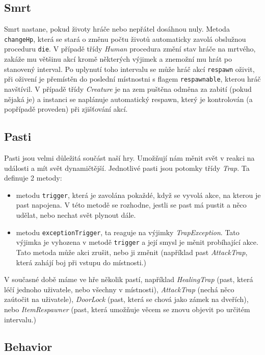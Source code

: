 \documentclass[11pt, a4paper]{article}
\def\class#1{\emph{#1}}
\begin{document}
\subsection{Smrt}

Smrt nastane, pokud životy hráče nebo nepřátel dosáhnou nuly. Metoda \texttt{changeHp}, která se stará o změnu počtu životů automaticky zavolá obslužnou proceduru \texttt{die}. V případě třídy \class{Human} procedura změní stav hráče na mrtvého, zakáže mu většinu akcí kromě některých výjimek a znemožní mu hrát po stanovený interval. Po uplynutí toho intervalu se může hráč akcí \texttt{respawn} oživit, při oživení je přemístěn do poslední místnostni s flagem \texttt{respawnable}, kterou hráč navštívil. V případě třídy \class{Creature} je na zem puštěna odměna za zabití (pokud nějaká je) a instanci se naplánuje automatický respawn, který je kontrolován (a popřípadě proveden) při zjišťování akcí.

\subsection{Pasti}

Pasti jsou velmi důležitá součást naší hry. Umožňují nám měnit svět v reakci na události a mít svět dynamičtější. Jednotlivé pasti jsou potomky třídy \class{Trap}. Ta definuje 2 metody:
\begin{itemize}
\item metodu \texttt{trigger}, která je zavolána pokaždé, když se vyvolá akce, na kterou je past napojena. V této metodě se rozhodne, jestli se past má pustit a něco udělat, nebo nechat svět plynout dále.
\item metodu \texttt{exceptionTrigger}, ta reaguje na výjimky \class{TrapException}. Tato výjimka je vyhozena v metodě \texttt{trigger} a její smysl je měnit probíhající akce. Tato metoda může akci zrušit, nebo ji změnit (například past \class{AttackTrap}, která zahájí boj při vstupu do místnosti.)
\end{itemize}
V současné době máme ve hře několik pastí, například \class{HealingTrap} (past, která léčí jednoho uživatele, nebo všechny v místnosti), \class{AttackTrap} (nechá něco zaútočit na uživatele), \class{DoorLock} (past, která se chová jako zámek na dveřích), nebo \class{ItemRespawner} (past, která umožňuje věcem se znovu objevit po určitém intervalu.)

\subsection{Behavior}
\end{document}
